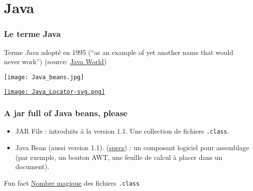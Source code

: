 \documentclass[english, french]{beamer}
\begin{document}
\section{Java}
\begin{frame}[fragile]
	\frametitle{Le terme Java}
	
	Terme \emph{Java} adopté en 1995 (“as an example of yet another name that would never work”) {\scriptsize{(source: \href{https://www.javaworld.com/article/2077265/core-java/so-why-did-they-decide-to-call-it-java-.html}{Java World})}}
	\hfill
	\vfill
	\begin{minipage}[b]{3cm}
		\texttt{[image: Java\_beans.jpg]}
	\end{minipage}%
	\begin{minipage}[b]{(\columnwidth - 3cm)}
		\href{https://en.wikipedia.org/wiki/Java}{\texttt{[image: Java\_Locator-svg.png]}}
	\end{minipage}
\end{frame}

\begin{frame}
	\frametitle{A jar full of Java beans, please}
	\begin{itemize}
		\item JAR File : introduits à la version 1.1. Une collection de fichiers \texttt{.class}.
		\item Java Bean (aussi version 1.1). (\href{https://www.oracle.com/technetwork/java/javase/documentation/spec-136004.html}{specs}) : un composant logiciel pour assemblage (par exemple, un bouton AWT, une feuille de calcul à placer dans un document).
	\end{itemize}
	\begin{block}{Fun fact}
		\href{https://en.wikipedia.org/wiki/Java_class_file\#Magic_Number}{Nombre magique} des fichiers \texttt{.class}
	\end{block}
\end{frame}
\end{document}
